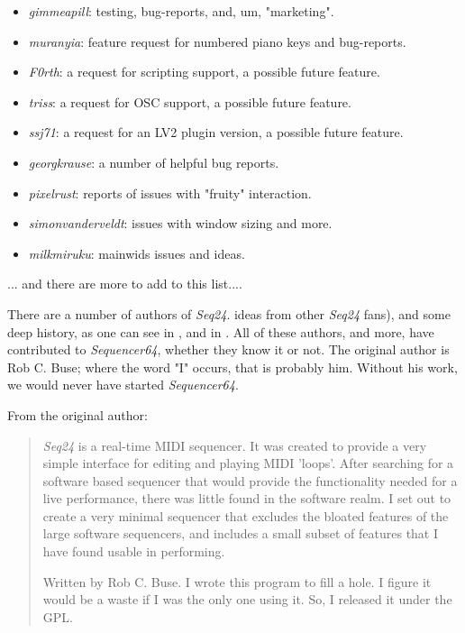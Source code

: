    \begin{itemize}
      \item \textsl{gimmeapill}:
         testing, bug-reports, and, um, "marketing".
      \item \textsl{muranyia}:
         feature request for numbered piano keys and bug-reports.
      \item \textsl{F0rth}:
         a request for scripting support, a possible future feature.
      \item \textsl{triss}:
         a request for OSC support, a possible future feature.
      \item \textsl{ssj71}:
         a request for an LV2 plugin version, a possible future feature.
      \item \textsl{georgkrause}:
         a number of helpful bug reports.
      \item \textsl{pixelrust}:
         reports of issues with "fruity" interaction.
      \item \textsl{simonvanderveldt}:
         issues with window sizing and more.
      \item \textsl{milkmiruku}:
         mainwids issues and ideas.
         
   \end{itemize}

   ... and there are more to add to this list....

   There are a number of authors of \textsl{Seq24}.
   ideas from other \textsl{Seq24} fans),
   and some deep history,
   as one can see in ,
   and in .
   All of these authors, and more, have contributed to \textsl{Sequencer64},
   whether they know it or not.
   The original author is Rob C. Buse; where the word "I" occurs, that is
   probably him.  Without his work, we would never have started
   \textsl{Sequencer64}.

   From the original author:

   \begin{quotation}
      \textsl{Seq24} is a real-time MIDI sequencer. It was created to
      provide a very simple interface for editing and playing MIDI 'loops'.
      After searching for a software based sequencer that would provide the
      functionality needed for a live performance, there was little found in
      the software realm. I set out to create a very minimal sequencer that
      excludes the bloated features of the large software sequencers, and
      includes a small subset of features that I have found usable in
      performing. 

      Written by Rob C. Buse.  I wrote this program to fill a
      hole.  I figure it would be a waste if I was the only one
      using it.  So, I released it under the GPL.
   \end{quotation}

